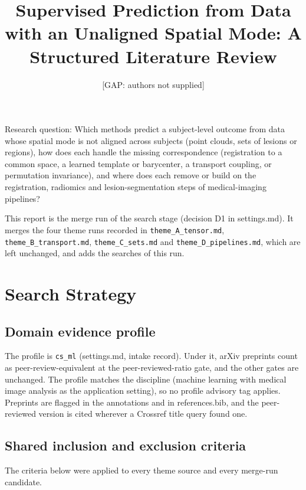 \documentclass[journal,onecolumn]{IEEEtran}
\begin{document}
\title{Supervised Prediction from Data with an Unaligned Spatial Mode: A Structured Literature Review}
\author{[GAP: authors not supplied]}

\maketitle

Research question: Which methods predict a subject-level outcome from data whose spatial mode is not aligned across subjects (point clouds, sets of lesions or regions), how does each handle the missing correspondence (registration to a common space, a learned template or barycenter, a transport coupling, or permutation invariance), and where does each remove or build on the registration, radiomics and lesion-segmentation steps of medical-imaging pipelines?

This report is the merge run of the search stage (decision D1 in settings.md). It merges the four theme runs recorded in \nolinkurl{theme_A_tensor.md}, \nolinkurl{theme_B_transport.md}, \nolinkurl{theme_C_sets.md} and \nolinkurl{theme_D_pipelines.md}, which are left unchanged, and adds the searches of this run.

\section{Search Strategy}

\subsection{Domain evidence profile}

The profile is \texttt{cs\_ml} (settings.md, intake record). Under it, arXiv preprints count as peer-review-equivalent at the peer-reviewed-ratio gate, and the other gates are unchanged. The profile matches the discipline (machine learning with medical image analysis as the application setting), so no profile advisory tag applies. Preprints are flagged in the annotations and in references.bib, and the peer-reviewed version is cited wherever a Crossref title query found one.

\subsection{Shared inclusion and exclusion criteria}

The criteria below were applied to every theme source and every merge-run candidate.
\end{document}
